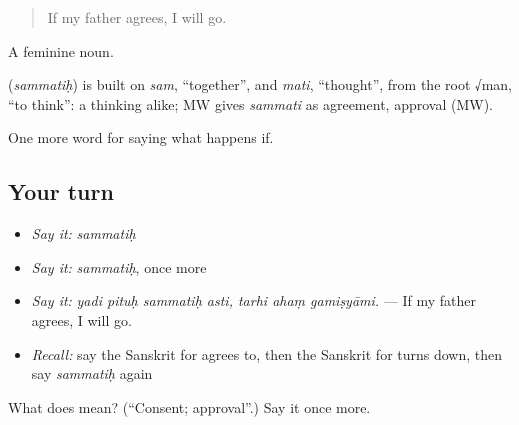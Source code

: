 \begin{quote}
If my father agrees, I will go.
\end{quote}

A feminine noun.

\begin{cousinweb}
\textbf{} (\emph{sammatiḥ}) is built on \emph{sam}, \textquotedblleft{}together\textquotedblright{}, and \emph{mati}, \textquotedblleft{}thought\textquotedblright{}, from the root √man, \textquotedblleft{}to think\textquotedblright{}: a thinking alike; MW gives \emph{sammati} as agreement, approval (MW).
\end{cousinweb}

\begin{grammarlens}[title={What you've built}]
One more word for saying what happens if.
\end{grammarlens}

\subsection*{Your turn}
\begin{itemize}
\raggedright
  \item \emph{Say it:} \emph{sammatiḥ}
  \item \emph{Say it:} \emph{sammatiḥ}, once more
  \item \emph{Say it:} \emph{yadi pituḥ sammatiḥ asti, tarhi ahaṃ gamiṣyāmi.} — If my father agrees, I will go.
  \item \emph{Recall:} say the Sanskrit for agrees to, then the Sanskrit for turns down, then say \emph{sammatiḥ} again
\end{itemize}

\begin{tcolorbox}[breakable,colback=teal!4,colframe=teal!35!black,title={Before you move on}]
What does  mean? (\textquotedblleft{}Consent; approval\textquotedblright{}.) Say it once more.
\end{tcolorbox}
